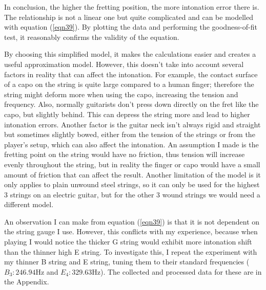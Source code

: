 In conclusion, the higher the fretting position, the more intonation error there is. The relationship is not a linear one but quite complicated and can be modelled with equation (\ref{eqn39}). By plotting the data and performing the goodness-of-fit test, it reasonably confirms the validity of the equation. \par
By choosing this simplified model, it makes the calculations easier and creates a useful approximation model. However, this doesn't take into account several factors in reality that can affect the intonation. For example, the contact surface of a capo on the string is quite large compared to a human finger; therefore the string might deform more when using the capo, increasing the tension and frequency. Also, normally guitarists don't press down directly on the fret like the capo, but slightly behind. This can depress the string more and lead to higher intonation errors. Another factor is the guitar neck isn't always rigid and straight but sometimes slightly bowed, either from the tension of the strings or from the player's setup, which can also affect the intonation. An assumption I made is the fretting point on the string would have no friction, thus tension will increase evenly throughout the string, but in reality the finger or capo would have a small amount of friction that can affect the result. Another limitation of the model is it only applies to plain unwound steel strings, so it can only be used for the highest 3 strings on an electric guitar, but for the other 3 wound strings we would need a different model.\par

An observation I can make from equation (\ref{eqn39}) is that it is not dependent on the string gauge I use. However, this conflicts with my experience, because when playing I would notice the thicker G string would exhibit more intonation shift than the thinner high E string. To investigate this, I repeat the experiment with my thinner B string and E string, tuning them to their standard frequencies ($B_3: 246.94$Hz and $E_4: 329.63$Hz). The collected and processed data for these are in the Appendix.

